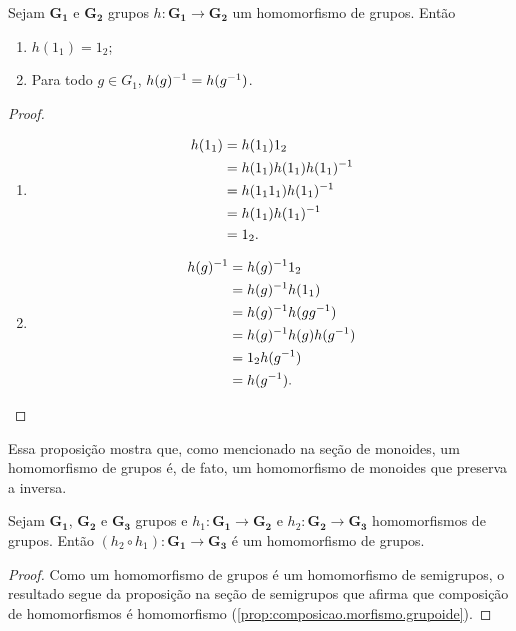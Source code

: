 \begin{proposition}
\label{prop.hom.gru}
Sejam $\bm{G_1}$ e $\bm{G_2}$ grupos $h: \bm{G_1} \to \bm{G_2}$ um homomorfismo de grupos. Então
	\begin{enumerate}
	\item $h(1_1)=1_2$;
	\item Para todo $g \in G_1$, $h(g)^{-1}=h(g^{-1})$.
	\end{enumerate}
\end{proposition}
\begin{proof}
	\begin{enumerate}
	\item
		\begin{align*}
		h(1_1) &= h(1_1) 1_2 \\
			&= h(1_1) h(1_1) h(1_1)^{-1} \\
			&= h(1_1 1_1) h(1_1)^{-1} \\
			&= h(1_1) h(1_1)^{-1} \\
			&= 1_2.
		\end{align*}
	\item
		\begin{align*}
		h(g)^{-1} &= h(g)^{-1} 1_2 \\
			&= h(g)^{-1} h(1_1) \\
			&= h(g)^{-1} h(g g^{-1}) \\
			&= h(g)^{-1} h(g) h(g^{-1}) \\
			&= 1_2 h(g^{-1}) \\
			&= h(g^{-1}). \qedhere
		\end{align*}
	\end{enumerate}
\end{proof}

	Essa proposição mostra que, como mencionado na seção de monoides, um homomorfismo de grupos é, de fato, um homomorfismo de monoides que preserva a inversa.

\begin{proposition}
\label{comp.hom.gru}
Sejam $\bm{G_1}$, $\bm{G_2}$ e $\bm{G_3}$ grupos e $h_1: \bm{G_1} \to \bm{G_2}$ e $h_2: \bm{G_2} \to \bm{G_3}$ homomorfismos de grupos. Então $(h_2 \circ h_1): \bm{G_1} \to \bm{G_3}$ é um homomorfismo de grupos.
\end{proposition}
\begin{proof}
Como um homomorfismo de grupos é um homomorfismo de semigrupos, o resultado segue da proposição na seção de semigrupos que afirma que composição de homomorfismos é homomorfismo (\ref{prop:composicao.morfismo.grupoide}).
\end{proof}

